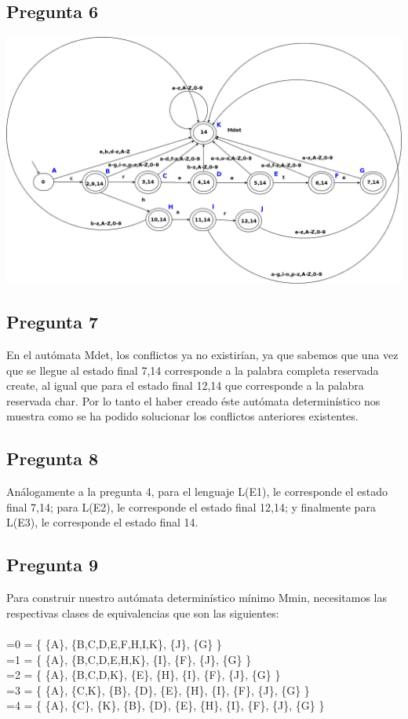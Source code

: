 \documentclass{article}
\begin{document}
\subsection{Pregunta 6}
\hspace{0.5cm}
\includegraphics[scale=0.2]{preg6} 

\subsection{Pregunta 7}
\hspace{0.5cm} En el autómata Mdet, los conflictos ya no existirían, ya que sabemos que una vez que se llegue al estado final 7,14 corresponde a la palabra completa reservada create, al igual que para el estado final 12,14 que corresponde a la palabra reservada char. Por lo tanto el haber creado éste autómata determinístico nos muestra como se ha podido solucionar los conflictos anteriores existentes.

\subsection{Pregunta 8}
\hspace{0.5cm} Análogamente a la pregunta 4, para el lenguaje L(E1), le corresponde el estado final 7,14; para L(E2), le corresponde el estado final 12,14; y finalmente para L(E3), le corresponde el estado final 14.

\subsection{Pregunta 9}
\hspace{0.5cm} Para construir nuestro autómata determinístico mínimo Mmin, necesitamos las respectivas clases de equivalencias que son las siguientes: \\  \\ 
=0 = \{ \{A\}, \{B,C,D,E,F,H,I,K\}, \{J\}, \{G\} \} \\
=1 = \{ \{A\}, \{B,C,D,E,H,K\}, \{I\}, \{F\}, \{J\}, \{G\} \} \\ 
=2 = \{ \{A\}, \{B,C,D,K\}, \{E\}, \{H\}, \{I\}, \{F\}, \{J\}, \{G\} \} \\
=3 = \{ \{A\}, \{C,K\}, \{B\}, \{D\}, \{E\}, \{H\}, \{I\}, \{F\}, \{J\}, \{G\} \} \\ 
=4 = \{ \{A\}, \{C\}, \{K\}, \{B\}, \{D\}, \{E\}, \{H\}, \{I\}, \{F\}, \{J\}, \{G\} \} \\
\end{document}
